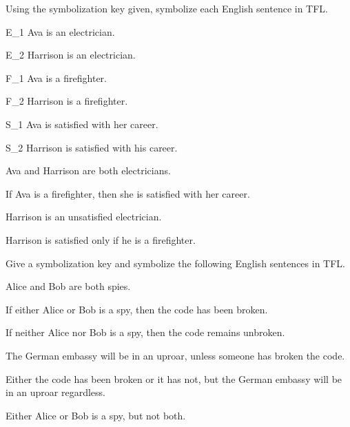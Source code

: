 \problempart Using the symbolization key given, symbolize each English sentence in TFL.\label{pr.avacareer}
	\begin{ekey}
		\item[E_1] Ava is an electrician.
		\item[E_2] Harrison is an electrician.
		\item[F_1] Ava is a firefighter.
		\item[F_2] Harrison is a firefighter.
		\item[S_1] Ava is satisfied with her career.
		\item[S_2] Harrison is satisfied with his career.
	\end{ekey}
\begin{earg}
\item Ava and Harrison are both electricians.
\item If Ava is a firefighter, then she is satisfied with her career.
\item Harrison is an unsatisfied electrician.
\item Harrison is satisfied only if he is a firefighter.
\end{earg}



\solutions
\problempart
\label{pr.spies}
Give a symbolization key and symbolize the following English sentences in TFL.
\begin{earg}
\item Alice and Bob are both spies.
\item If either Alice or Bob is a spy, then the code has been broken.
\item If neither Alice nor Bob is a spy, then the code remains unbroken.
\item The German embassy will be in an uproar, unless someone has broken the code.
\item Either the code has been broken or it has not, but the German embassy will be in an uproar regardless.
\item Either Alice or Bob is a spy, but not both.
\end{earg}

